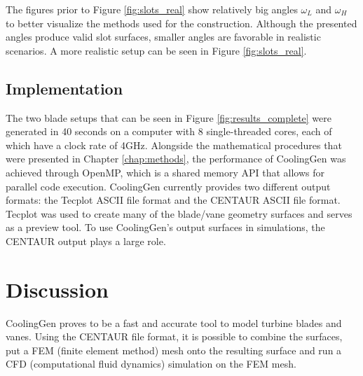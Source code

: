 \documentclass[a4paper, 11pt]{report}
\theoremstyle{definition}
\begin{document}
	The figures prior to Figure \ref{fig:slots_real} show relatively big angles $\omega_L$ and $\omega_H$ to better visualize the methods used for the construction. Although the presented angles produce valid slot surfaces, smaller angles are favorable in realistic scenarios. A more realistic setup can be seen in Figure \ref{fig:slots_real}.

\section{Implementation}\label{sec:implementation}
	The two blade setups that can be seen in Figure \ref{fig:results_complete} were generated in 40 seconds on a computer with 8 single-threaded cores, each of which have a clock rate of 4GHz. Alongside the mathematical procedures that were presented in Chapter \ref{chap:methods}, the performance of CoolingGen was achieved through OpenMP, which is a shared memory API that allows for parallel code execution. CoolingGen currently provides two different output formats: the Tecplot ASCII file format and the CENTAUR ASCII file format. Tecplot was used to create many of the blade/vane geometry surfaces and serves as a preview tool. To use CoolingGen's output surfaces in simulations, the CENTAUR output plays a large role.

\chapter{Discussion}
	CoolingGen proves to be a fast and accurate tool to model turbine blades and vanes. Using the CENTAUR file format, it is possible to combine the surfaces, put a FEM (finite element method) mesh onto the resulting surface and run a CFD (computational fluid dynamics) simulation on the FEM mesh.
\end{document}
